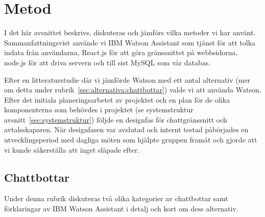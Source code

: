 \documentclass[a4paper,12pt]{article}
\begin{document}
\section{Metod}
{\em


}

I det här avsnittet beskrivs, diskuteras och jämförs vilka metoder vi har använt. Sammanfattningsvist använde vi IBM Watson Assistant som tjänst för att tolka indata från användarna, React.js för att göra gränssnittet på webbsidorna, node.js för att driva servern och till sist MySQL som vår databas.

Efter en litteraturstudie där vi jämförde Watson med ett antal alternativ (mer om detta under rubrik~\ref{sec:alternativa:chattbottar}) valde vi att använda Watson. Efter det initiala planeringsarbetet av projektet och en plan för de olika komponenterna som behövdes i projektet (se systemstruktur avsnitt~\ref{sec:systemstruktur}) följde en designfas för chattgränssnitt och avtalsskaparen. När designfasen var avslutad och internt testad påbörjades en utvecklingsperiod med dagliga möten som hjälpte gruppen framåt och gjorde att vi kunde säkerställa att inget släpade efter.

\subsection{Chattbottar}

Under denna rubrik diskuteras två olika kategorier av chattbottar samt förklaringar av IBM Watson Assistant i detalj och kort om dess alternativ.
\end{document}
